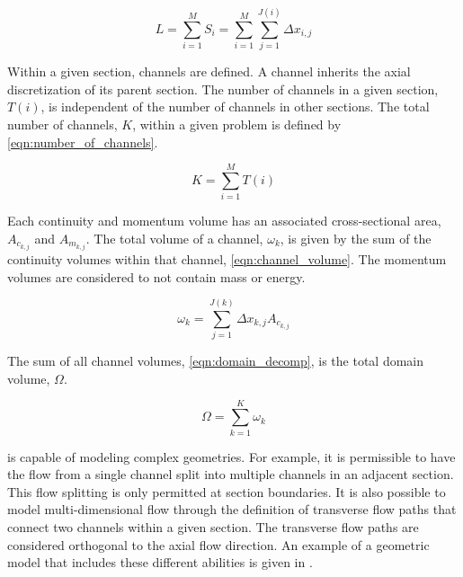 \begin{equation}
\label{eqn:sections}
L = \sum_{i=1}^{M} S_i = \sum_{i=1}^{M}\sum_{j=1}^{J(i)} \Delta x_{i,j}
\end{equation}

Within a given section, channels are defined.
A channel inherits the axial discretization of its parent section.
The number of channels in a given section, $T(i)$, is independent of the number of channels in other sections.
The total number of channels, $K$, within a given problem is defined by \eqref{eqn:number_of_channels}.

\begin{equation}
\label{eqn:number_of_channels}
K = \sum_{i = 1}^{M} T(i)
\end{equation}

Each continuity and momentum volume has an associated cross-sectional area, $A_{c_{k,j}}$ and $A_{m_{k,j}}$. 
The total volume of a channel, $\omega_k$, is given by the sum of the continuity volumes within that channel, \eqref{eqn:channel_volume}.
The momentum volumes are considered to not contain mass or energy.

\begin{equation}
\label{eqn:channel_volume}
\omega_k = \sum_{j = 1}^{J(k)} \Delta x_{k,j} A_{c_{k,j}}
\end{equation}

The sum of all channel volumes, \eqref{eqn:domain_decomp}, is the total domain volume, $\Omega$.

\begin{equation}
\label{eqn:domain_decomp}
\Omega = \sum_{k = 1}^{K} \omega_{k}
\end{equation}

\cobra{} is capable of modeling complex geometries.
For example, it is permissible to have the flow from a single channel split into multiple channels in an adjacent section.
This flow splitting is only permitted at section boundaries.
It is also possible to model multi-dimensional flow through the definition of transverse flow paths that connect two channels within a given section.
The transverse flow paths are considered orthogonal to the axial flow direction.
An example of a geometric model that includes these different abilities is given in .

